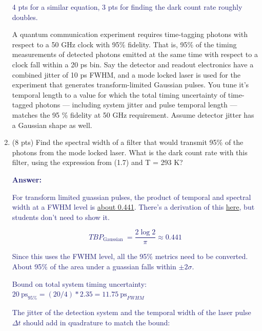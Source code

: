 \documentclass[11pt]{caltech_thesis} %
\begin{document}
\begin{enumerate}
  \textcolor{midnightblue}{4 pts for a similar equation, 3 pts for
  finding the dark count rate roughly doubles. }

  A quantum communication experiment requires time-tagging photons with
  respect to a 50 GHz clock with 95\% fidelity. That is, 95\% of the
  timing measurements of detected photons emitted at the same time with
  respect to a clock fall within a 20 ps bin. Say the detector and
  readout electronics have a combined jitter of 10 ps FWHM, and a mode
  locked laser is used for the experiment that generates
  transform-limited Gaussian pulses. You tune it's temporal length to a
  value for which the total timing uncertainty of time-tagged photons
  --- including system jitter and pulse temporal length --- matches the
  95 \% fidelity at 50 GHz requirement. Assume detector jitter has a
  Gaussian shape as well.
\item
  (8 pts) Find the spectral width of a filter that would transmit 95\%
  of the photons from the mode locked laser. What is the dark count rate
  with this filter, using the expression from (1.7) and T = 293 K?

  \textcolor{midnightblue}{ \textbf{Answer:} }

  \textcolor{midnightblue}{For transform limited guassian pulses, the
  product of temporal and spectral width at a FWHM level is
  \href{https://www.lasercalculator.com/transform-limited-pulse-calculator/}{about
  0.441}. There's a derivation of this
  \href{https://www.physicsforums.com/threads/time-bandwidth-product-ideal-mode-locking.171404/post-1339948}{here},
  but students don't need to show it. }

  \textcolor{midnightblue}{

  \[T B P_{\text {Gaussian }}=\frac{2 \log 2}{\pi} \approx 0.441\]

  }

  \textcolor{midnightblue}{ Since this uses the FWHM level, all the 95\%
  metrics need to be converted. About 95\% of the area under a guassian
  falls within \(\pm 2 \sigma\). }

  \textcolor{midnightblue}{ Bound on total system timing uncertainty:
  \(20~\text{ps}_{95\%} = (20/4)*2.35 = 11.75~\text{ps}_{FWHM}\) }

  \textcolor{midnightblue}{ The jitter of the detection system and the
  temporal width of the laser pulse \(\Delta t\) should add in
  quadrature to match the bound: }

  \textcolor{midnightblue}{

}
\end{enumerate}
\end{document}
